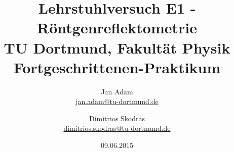 

\usepackage{longtable}

\title{Lehrstuhlversuch E1 - Röntgenreflektometrie\\				%
\large TU Dortmund, Fakultät Physik\\ 
\normalsize Fortgeschrittenen-Praktikum}

\author{Jan Adam\\			%
{\small \href{jan.adam@tu-dortmund.de}{jan.adam@tu-dortmund.de}}	%
\and						%
Dimitrios Skodras\\					%
{\small \href{dimitrios.skodras@tu-dortmund.de}{dimitrios.skodras@tu-dortmund.de}}		%
}
\date{09.06.2015}				%





\maketitle					%
\thispagestyle{empty} 				%



\tableofcontents


\newpage					%


